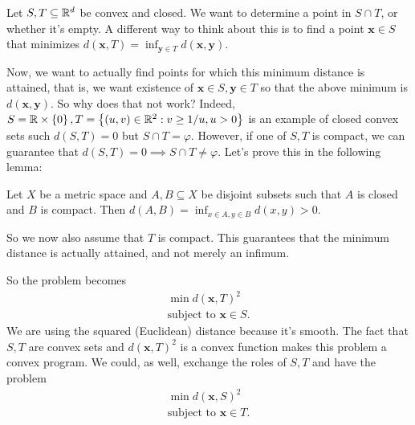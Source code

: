 Let $S,T\subseteq \mathbb{R}^d$ be convex and closed. We want to determine a point in $S\cap T$, or whether it's empty. A different way to think about this is to find a point $\pmb x\in S$ that minimizes $\displaystyle d(\pmb x,T) = \inf_{\pmb y\in T}d(\pmb x,\pmb y)$. 

Now, we want to actually find points for which this minimum distance is attained, that is, we want existence of $\pmb x\in S,\pmb y\in T$ so that the above minimum is $d(\pmb x,\pmb y)$. So why does that not work? Indeed, $S = \mathbb{R}\times \left\{0\right\}, T = \left\{(u,v)\in \mathbb{R}^2: v\geq 1/u, u>0\right\}$ is an example of closed convex sets such $d(S,T) = 0$ but $S\cap T = \varphi$. However, if one of $S,T$ is compact, we can guarantee that $d(S,T)=0\implies S\cap T \neq \varphi$. Let's prove this in the following lemma:

\begin{lemma}
Let $X$ be a metric space and $A,B\subseteq X$ be disjoint subsets such that $A$ is closed and $B$ is compact. Then $\displaystyle d(A,B) = \inf_{x\in A,y\in B} d(x,y) >0$.
\end{lemma}



So we now also assume that $T$ is compact. This guarantees that the minimum distance is actually attained, and not merely an infimum.

So the problem becomes 
\begin{align*}
\min d(\pmb x,T)^2\\
\text{subject to } \pmb x \in S.
\end{align*}
We are using the squared (Euclidean) distance because it's smooth.
The fact that $S,T$ are convex sets and $d(\pmb x,T)^2$ is a convex function makes this problem a convex program. We could, as well, exchange the roles of $S,T$ and have the problem 
\begin{align*}
\min d(\pmb x,S)^2\\
\text{subject to } \pmb x \in T.
\end{align*}




